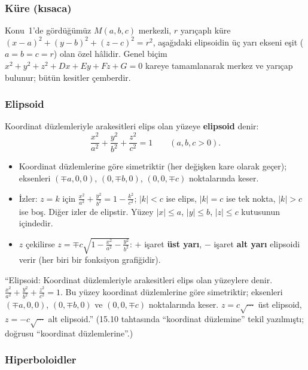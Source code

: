 \subsubsection{Küre (kısaca)}

Konu~1'de gördüğümüz $M(a,b,c)$ merkezli, $r$ yarıçaplı küre $(x-a)^2+(y-b)^2+(z-c)^2=r^2$, aşağıdaki elipsoidin üç yarı ekseni eşit ($a=b=c=r$) olan özel hâlidir. Genel biçim $x^2+y^2+z^2+Dx+Ey+Fz+G=0$ kareye tamamlanarak merkez ve yarıçap bulunur; bütün kesitler çemberdir.

\subsubsection{Elipsoid}

\begin{tanim}[Elipsoid]
Koordinat düzlemleriyle arakesitleri elips olan yüzeye \textbf{elipsoid} denir:
\[ \frac{x^2}{a^2}+\frac{y^2}{b^2}+\frac{z^2}{c^2}=1\qquad(a,b,c>0). \]
\end{tanim}
\begin{itemize}
  \item Koordinat düzlemlerine göre simetriktir (her değişken kare olarak geçer); eksenleri $(\mp a,0,0)$, $(0,\mp b,0)$, $(0,0,\mp c)$ noktalarında keser.
  \item İzler: $z=k$ için $\frac{x^2}{a^2}+\frac{y^2}{b^2}=1-\frac{k^2}{c^2}$; $|k|<c$ ise elips, $|k|=c$ ise tek nokta, $|k|>c$ ise boş. Diğer izler de elipstir. Yüzey $|x|\le a$, $|y|\le b$, $|z|\le c$ kutusunun içindedir.
  \item $z$ çekilirse $z=\mp c\sqrt{1-\frac{x^2}{a^2}-\frac{y^2}{b^2}}$: $+$ işaret \textbf{üst yarı}, $-$ işaret \textbf{alt yarı} elipsoidi verir (her biri bir fonksiyon grafiğidir).
\end{itemize}

\begin{tahta}
``Elipsoid: Koordinat düzlemleriyle arakesitleri elips olan yüzeylere denir. $\frac{x^2}{a^2}+\frac{y^2}{b^2}+\frac{z^2}{c^2}=1$. Bu yüzey koordinat düzlemlerine göre simetriktir; eksenleri $(\mp a,0,0)$, $(0,\mp b,0)$ ve $(0,0,\mp c)$ noktalarında keser. $z=c\sqrt{\cdots}$ üst elipsoid, $z=-c\sqrt{\cdots}$ alt elipsoid.''
(15.10 tahtasında ``koordinat düzlemine'' tekil yazılmıştı; doğrusu ``koordinat düzlemlerine''.)
\end{tahta}

\subsubsection{Hiperboloidler}

